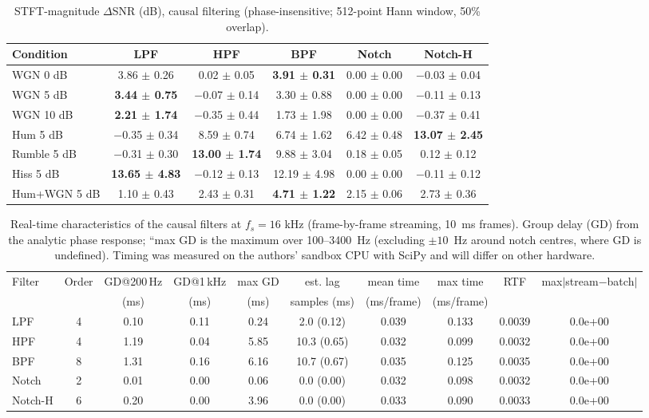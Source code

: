 \begin{table}[!t]
\caption{STFT-magnitude $\Delta$SNR (dB), causal filtering (phase-insensitive; 512-point Hann window, 50\% overlap).}
\label{tab:dsnr_mag}
\centering\footnotesize
\begin{tabular}{lccccc}
\hline
Condition & LPF & HPF & BPF & Notch & Notch-H \\ \hline
WGN 0 dB & 3.86 $\pm$ 0.26 & 0.02 $\pm$ 0.05 & \textbf{3.91 $\pm$ 0.31} & 0.00 $\pm$ 0.00 & $-$0.03 $\pm$ 0.04 \\
WGN 5 dB & \textbf{3.44 $\pm$ 0.75} & $-$0.07 $\pm$ 0.14 & 3.30 $\pm$ 0.88 & 0.00 $\pm$ 0.00 & $-$0.11 $\pm$ 0.13 \\
WGN 10 dB & \textbf{2.21 $\pm$ 1.74} & $-$0.35 $\pm$ 0.44 & 1.73 $\pm$ 1.98 & 0.00 $\pm$ 0.00 & $-$0.37 $\pm$ 0.41 \\
Hum 5 dB & $-$0.35 $\pm$ 0.34 & 8.59 $\pm$ 0.74 & 6.74 $\pm$ 1.62 & 6.42 $\pm$ 0.48 & \textbf{13.07 $\pm$ 2.45} \\
Rumble 5 dB & $-$0.31 $\pm$ 0.30 & \textbf{13.00 $\pm$ 1.74} & 9.88 $\pm$ 3.04 & 0.18 $\pm$ 0.05 & 0.12 $\pm$ 0.12 \\
Hiss 5 dB & \textbf{13.65 $\pm$ 4.83} & $-$0.12 $\pm$ 0.13 & 12.19 $\pm$ 4.98 & 0.00 $\pm$ 0.00 & $-$0.11 $\pm$ 0.12 \\
Hum+WGN 5 dB & 1.10 $\pm$ 0.43 & 2.43 $\pm$ 0.31 & \textbf{4.71 $\pm$ 1.22} & 2.15 $\pm$ 0.06 & 2.73 $\pm$ 0.36 \\
\hline
\end{tabular}

\end{table}

\begin{table}[!t]
\caption{Real-time characteristics of the causal filters at $f_s=16$ kHz (frame-by-frame streaming, 10~ms frames). Group delay (GD) from the analytic phase response; ``max GD is the maximum over 100--3400~Hz (excluding $\pm10$~Hz around notch centres, where GD is undefined). Timing was measured on the authors' sandbox CPU with SciPy and will differ on other hardware.}
\label{tab:rt}
\centering\footnotesize
\begin{tabular}{lccccccccc}
\hline
Filter & Order & GD@200\,Hz & GD@1\,kHz & max GD & est. lag & mean time & max time & RTF & max$|$stream$-$batch$|$ \\
 & & (ms) & (ms) & (ms) & samples (ms) & (ms/frame) & (ms/frame) & & \\ \hline
LPF & 4 & 0.10 & 0.11 & 0.24 & 2.0 (0.12) & 0.039 & 0.133 & 0.0039 & 0.0e+00 \\
HPF & 4 & 1.19 & 0.04 & 5.85 & 10.3 (0.65) & 0.032 & 0.099 & 0.0032 & 0.0e+00 \\
BPF & 8 & 1.31 & 0.16 & 6.16 & 10.7 (0.67) & 0.035 & 0.125 & 0.0035 & 0.0e+00 \\
Notch & 2 & 0.01 & 0.00 & 0.06 & 0.0 (0.00) & 0.032 & 0.098 & 0.0032 & 0.0e+00 \\
Notch-H & 6 & 0.20 & 0.00 & 3.96 & 0.0 (0.00) & 0.033 & 0.090 & 0.0033 & 0.0e+00 \\
\hline
\end{tabular}
\end{table}